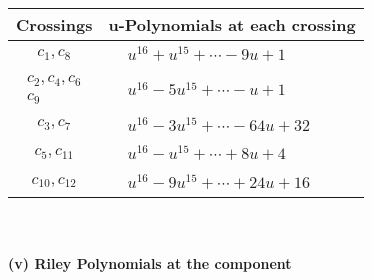 \documentclass[1p]{elsarticle_modified}
\theoremstyle{definition}
\begin{document}
\begin{tabular}{m{50pt}|m{274pt}}
Crossings & \hspace{64pt}u-Polynomials at each crossing \\
\hline $$\begin{aligned}c_{1},c_{8}\end{aligned}$$&$\begin{aligned}
&u^{16}+u^{15}+\cdots-9 u+1
\end{aligned}$\\
\hline $$\begin{aligned}c_{2},c_{4},c_{6}\\c_{9}\end{aligned}$$&$\begin{aligned}
&u^{16}-5 u^{15}+\cdots- u+1
\end{aligned}$\\
\hline $$\begin{aligned}c_{3},c_{7}\end{aligned}$$&$\begin{aligned}
&u^{16}-3 u^{15}+\cdots-64 u+32
\end{aligned}$\\
\hline $$\begin{aligned}c_{5},c_{11}\end{aligned}$$&$\begin{aligned}
&u^{16}- u^{15}+\cdots+8 u+4
\end{aligned}$\\
\hline $$\begin{aligned}c_{10},c_{12}\end{aligned}$$&$\begin{aligned}
&u^{16}-9 u^{15}+\cdots+24 u+16
\end{aligned}$\\
\hline
\end{tabular}\\~\\
\newpage\renewcommand{\arraystretch}{1}
\flushleft \textbf{(v) Riley Polynomials at the component}\newline \\
\end{document}
